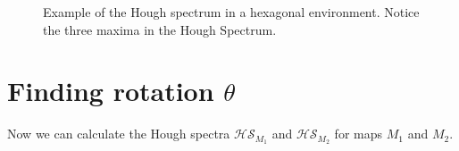 \begin{figure}[ht]
\centering
{}
\caption{Example of the Hough spectrum in a hexagonal environment. Notice the three maxima in the Hough Spectrum.}
\label{fig:beehive}
\end{figure}

\section{Finding rotation $\theta$}
Now we can calculate the Hough spectra $\mathcal{HS}_{M_1}$ and $\mathcal{HS}_{M_2}$ for maps $M_1$ and $M_2$. 

